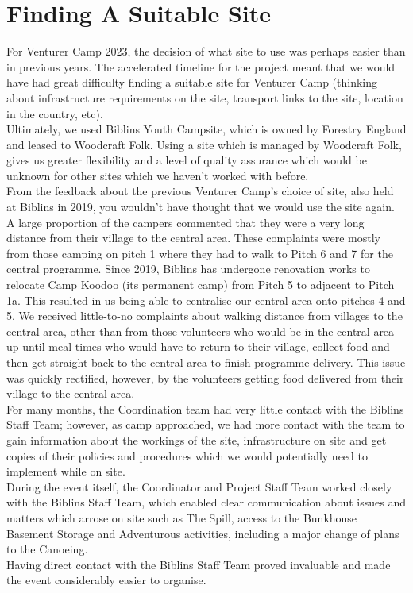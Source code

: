 \chapter{Finding A Suitable Site}
For Venturer Camp 2023, the decision of what site to use was perhaps easier than in previous years. The accelerated timeline for the project meant that we would have had great difficulty finding a suitable site for Venturer Camp (thinking about infrastructure requirements on the site, transport links to the site, location in the country, etc).\\

Ultimately, we used Biblins Youth Campsite, which is owned by Forestry England and leased to Woodcraft Folk. Using a site which is managed by Woodcraft Folk, gives us greater flexibility and a level of quality assurance which would be unknown for other sites which we haven't worked with before.\\

From the feedback about the previous Venturer Camp's choice of site, also held at Biblins in 2019, you wouldn't have thought that we would use the site again. A large proportion of the campers commented that they were a very long distance from their village to the central area. These complaints were mostly from those camping on pitch 1 where they had to walk to Pitch 6 and 7 for the central programme. Since 2019, Biblins has undergone renovation works to relocate Camp Koodoo (its permanent camp) from Pitch 5 to adjacent to Pitch 1a. This resulted in us being able to centralise our central area onto pitches 4 and 5. We received little-to-no complaints about walking distance from villages to the central area, other than from those volunteers who would be in the central area up until meal times who would have to return to their village, collect food and then get straight back to the central area to finish programme delivery. This issue was quickly rectified, however, by the volunteers getting food delivered from their village to the central area. \\

For many months, the Coordination team had very little contact with the Biblins Staff Team; however, as camp approached, we had more contact with the team to gain information about the workings of the site, infrastructure on site and get copies of their policies and procedures which we would potentially need to implement while on site.\\

During the event itself, the Coordinator and Project Staff Team worked closely with the Biblins Staff Team, which enabled clear communication about issues and matters which arrose on site such as The Spill, access to the Bunkhouse Basement Storage and Adventurous activities, including a major change of plans to the Canoeing. \\

Having direct contact with the Biblins Staff Team proved invaluable and made the event considerably easier to organise.
